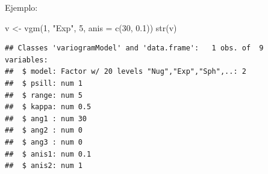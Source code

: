 \documentclass[
  spanish,
]{book}
\newenvironment{Shaded}{\begin{snugshade}}{\end{snugshade}}
\newcommand{\AttributeTok}[1]{\textcolor[rgb]{0.77,0.63,0.00}{#1}}
\newcommand{\DecValTok}[1]{\textcolor[rgb]{0.00,0.00,0.81}{#1}}
\newcommand{\FloatTok}[1]{\textcolor[rgb]{0.00,0.00,0.81}{#1}}
\newcommand{\FunctionTok}[1]{\textcolor[rgb]{0.00,0.00,0.00}{#1}}
\newcommand{\NormalTok}[1]{#1}
\newcommand{\OtherTok}[1]{\textcolor[rgb]{0.56,0.35,0.01}{#1}}
\newcommand{\StringTok}[1]{\textcolor[rgb]{0.31,0.60,0.02}{#1}}
\theoremstyle{break}
\begin{document}
Ejemplo:

\begin{Shaded}
\begin{Highlighting}[]
\NormalTok{v }\OtherTok{\textless{}{-}} \FunctionTok{vgm}\NormalTok{(}\DecValTok{1}\NormalTok{, }\StringTok{"Exp"}\NormalTok{, }\DecValTok{5}\NormalTok{, }\AttributeTok{anis =} \FunctionTok{c}\NormalTok{(}\DecValTok{30}\NormalTok{, }\FloatTok{0.1}\NormalTok{))}
\FunctionTok{str}\NormalTok{(v)}
\end{Highlighting}
\end{Shaded}

\begin{verbatim}
## Classes 'variogramModel' and 'data.frame':   1 obs. of  9 variables:
##  $ model: Factor w/ 20 levels "Nug","Exp","Sph",..: 2
##  $ psill: num 1
##  $ range: num 5
##  $ kappa: num 0.5
##  $ ang1 : num 30
##  $ ang2 : num 0
##  $ ang3 : num 0
##  $ anis1: num 0.1
##  $ anis2: num 1
\end{verbatim}
\end{document}
